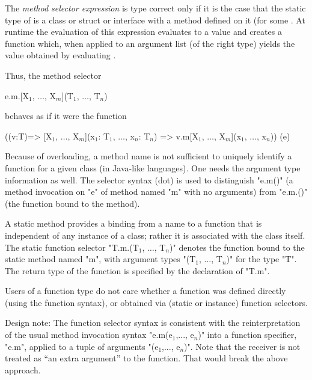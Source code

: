 The \emph{method selector expression}  is type
correct only if it is the case that the static type of  is a
class or struct or interface with a method
 defined on it (for some
. At runtime the evaluation of this expression
evaluates  to a value  and creates a function 
which, when applied to an argument list  (of the right
type) yields the value obtained by evaluating .

Thus, the method selector

\begin{xtenmath}
e.m.[X$_1$, $\dots$, X$_m$](T$_1$, $\dots$, T$_n$)
\end{xtenmath}
\noindent behaves as if it were the function
\begin{xtenmath}
((v:T)=>
  [X$_1$, $\dots$, X$_m$](x$_1$: T$_1$, $\dots$, x$_n$: T$_n$) => v.m[X$_1$, $\dots$, X$_m$](x$_1$, $\dots$, x$_n$))
(e)
\end{xtenmath}

\begin{note}
Because of overloading, a method name is not sufficient to
uniquely identify a function for a given class (in Java-like languages).
One needs the argument type information as well.
The selector syntax (dot) is used to distinguish \xcd"e.m()" (a
method invocation on \xcd"e" of method named \xcd"m" with no arguments)
from \xcd"e.m.()"
(the function bound to the method). 
\end{note}

A static method provides a binding from a name to a function that is
independent of any instance of a class; rather it is associated with the
class itself. The static function selector
\xcdmath"T.m.(T$_1$, $\dots$, T$_n$)" denotes the
function bound to the static method named \xcd"m", with argument types
\xcdmath"(T$_1$, $\dots$, T$_n$)" for the type \xcd"T". The return type
of the function is specified by the declaration of \xcd"T.m".

Users of a function type do not care whether a function was defined
directly (using the function syntax), or obtained via (static or
instance) function selectors.

\begin{note}
Design note: The function selector syntax is consistent with the
reinterpretation of the usual method invocation syntax
\xcdmath"e.m(e$_1$,..., e$_n$)"
into a function specifier, \xcd"e.m", applied to a tuple of arguments
\xcdmath"(e$_1$,..., e$_n$)". Note that the receiver is not
treated as ``an extra argument'' to the
function. That would break the above approach.
\end{note}

